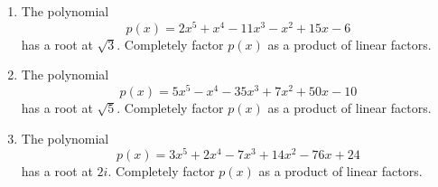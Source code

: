 \documentclass{article}
\begin{document}
\ActivityTitle[class={College Algebra}, number={5}, name={Polynomials 3}]

\begin{enumerate}
\item The polynomial \[ p(x) = 2x^5 + x^4 - 11x^3 - x^2 + 15x - 6 \] has a root at $\sqrt{3}$. Completely factor $p(x)$ as a product of linear factors. \vspace{7cm}

\newpage

\item The polynomial \[ p(x) = 5x^5 - x^4 - 35x^3 + 7x^2 + 50x - 10 \] has a root at $\sqrt{5}$. Completely factor $p(x)$ as a product of linear factors. \vspace{7cm}

\newpage

\item The polynomial \[ p(x) = 3x^5 + 2x^4 - 7x^3 + 14x^2 - 76x + 24 \] has a root at $2i$. Completely factor $p(x)$ as a product of linear factors. \vspace{7cm}

\end{enumerate}
\end{document}
